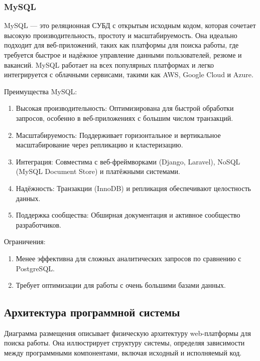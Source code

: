 \subsubsection{MySQL}

MySQL — это реляционная СУБД с открытым исходным кодом, которая сочетает высокую производительность, простоту и масштабируемость. Она идеально подходит для веб-приложений, таких как платформы для поиска работы, где требуется быстрое и надёжное управление данными пользователей, резюме и вакансий. MySQL работает на всех популярных платформах и легко интегрируется с облачными сервисами, такими как AWS, Google Cloud и Azure.

Преимущества MySQL:

\begin{enumerate}
	\item Высокая производительность: Оптимизирована для быстрой обработки запросов, особенно в веб-приложениях с большим числом транзакций.
	\item Масштабируемость: Поддерживает горизонтальное и вертикальное масштабирование через репликацию и кластеризацию.
	\item Интеграция: Совместима с веб-фреймворками (Django, Laravel), NoSQL (MySQL Document Store) и платёжными системами.
	\item Надёжность: Транзакции (InnoDB) и репликация обеспечивают целостность данных.
	\item Поддержка сообщества: Обширная документация и активное сообщество разработчиков.
\end{enumerate}

Ограничения:

\begin{enumerate}
	\item Менее эффективна для сложных аналитических запросов по сравнению с PostgreSQL.
	\item Требует оптимизации для работы с очень большими базами данных.
\end{enumerate}

\subsection{Архитектура программной системы}

Диаграмма размещения описывает физическую архитектуру web-платформы для поиска работы. Она иллюстрирует структуру системы, определяя зависимости между программными компонентами, включая исходный и исполняемый код.

